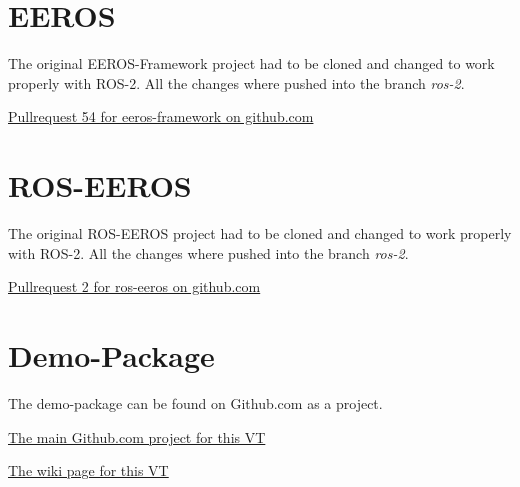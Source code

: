 

\section*{EEROS} \label{app:eeros}

The original EEROS-Framework project had to be cloned and changed to work properly with ROS-2. All the changes where pushed into the branch \textit{ros-2}.

\href{https://github.com/eeros-project/eeros-framework/pull/54}{Pullrequest 54 for eeros-framework on github.com}



\section*{ROS-EEROS} \label{app:ros-eeros}

The original ROS-EEROS project had to be cloned and changed to work properly with ROS-2. All the changes where pushed into the branch \textit{ros-2}.

\href{https://github.com/eeros-project/ros-eeros/pull/2}{Pullrequest 2 for ros-eeros on github.com}


\section*{Demo-Package} \label{app:demo-package}

The demo-package can be found on Github.com as a project.

\href{https://github.com/LukyLuke/mse_vt_eeros}{The main Github.com project for this VT}

\href{https://github.com/LukyLuke/mse_vt_eeros/wiki}{The wiki page for this VT}


